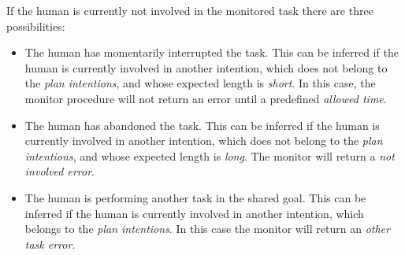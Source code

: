 If the human is currently not involved in the monitored task there are three possibilities:
\begin{itemize}
	\item The human has momentarily interrupted the task. This can be inferred if the human is currently involved in another intention, which does not belong to the \textit{plan intentions}, and whose expected length is \textit{short}. In this case, the monitor procedure will not return an error until a predefined \textit{allowed time}.
	\item The human has abandoned the task.  This can be inferred if the human is currently involved in another intention, which does not belong to the \textit{plan intentions}, and whose expected length is \textit{long}. The monitor will return a \textit{not involved error}. 
	\item The human is performing another task in the shared goal. This can be inferred if the human is currently involved in another intention, which belongs to the \textit{plan intentions}. In this case the monitor will return an \textit{other task error}. 
\end{itemize}




